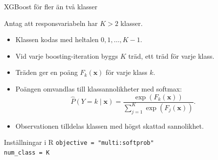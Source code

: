 \documentclass[10pt,english]{beamer}
\begin{document}
\begin{frame}{XGBoost för fler än två klasser}

  Antag att responsvariabeln har \(K>2\) klasser.

  \begin{itemize}

    \item Klassen kodas med heltalen
          \(0,1,\ldots,K-1\).

    \item Vid varje boosting-iteration byggs \(K\) träd,
          ett träd för varje klass.

    \item Träden ger en poäng \(F_k(\boldsymbol{x})\)
          för varje klass \(k\).

    \item Poängen omvandlas till klassannolikheter med softmax:
          \[
            \widehat{P}(Y=k\mid\boldsymbol{x})
            =
            \frac{\exp(F_k(\boldsymbol{x}))}
                 {\sum_{j=1}^{K}\exp(F_j(\boldsymbol{x}))}.
          \]

    \item Observationen tilldelas klassen med högst
          skattad sannolikhet.

  \end{itemize}

  \begin{block}{Inställningar i R}
    \texttt{objective = "multi:softprob"}\\
    \texttt{num\_class = K}
  \end{block}

\end{frame}
\end{document}
